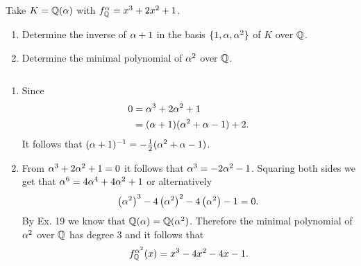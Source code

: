     \begin{ex}{21.29}
        Take $K=\mathbb{Q}(\alpha)$ with $f^\alpha_{\mathbb{Q}}=x^3+2x^2+1$.
        \begin{enumerate}
            \item Determine the inverse of $\alpha+1$ in the basis $\{1,\alpha,\alpha^2\}$ of $K$ over $\mathbb{Q}$.
            \item Determine the minimal polynomial of $\alpha^2$ over $\mathbb{Q}$.
        \end{enumerate}
    \end{ex}
    \begin{sol}
        ${}$
        \begin{enumerate}
            \item Since
                \begin{align*}
                    0&=\alpha^3+2\alpha^2+1\\
                    &=(\alpha+1)(\alpha^2+\alpha-1)+2.
                \end{align*}
                It follows that $(\alpha+1)^{-1}=-\frac12(\alpha^2+\alpha-1)$.
            \item From $\alpha^3+2\alpha^2+1=0$ it follows that $\alpha^3=-2\alpha^2-1$.
                Squaring both sides we get that $\alpha^6=4\alpha^4+4\alpha^2+1$ or alternatively
                $$\left(\alpha^2\right)^3-4\left(\alpha^2\right)^2-4\left(\alpha^2\right)-1=0.$$
                By Ex. 19 we know that $\mathbb{Q}(\alpha)=\mathbb{Q}(\alpha^2)$.
                Therefore the minimal polynomial of $\alpha^2$ over $\mathbb{Q}$ has degree 3 and it follows that
                $$ f^{\alpha^2}_{\mathbb{Q}}(x)=x^3-4x^2-4x-1. $$
        \end{enumerate}
    \end{sol}

